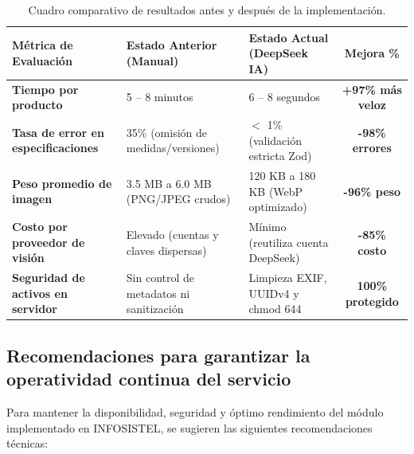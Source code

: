 \documentclass[11pt,a4paper]{article}
\begin{document}
\begin{table}[htbp]
\centering
\small
\begin{tabularx}{\textwidth}{p{4.5cm} X X c}
\toprule
\rowcolor{tableheader}
\color{white}\textbf{Métrica de Evaluación} & \color{white}\textbf{Estado Anterior (Manual)} & \color{white}\textbf{Estado Actual (DeepSeek IA)} & \color{white}\textbf{Mejora \%} \\
\midrule
\rowcolor{lightrow}
\textbf{Tiempo por producto} & 5 -- 8 minutos & 6 -- 8 segundos & \textbf{+97\% más veloz} \\
\midrule
\textbf{Tasa de error en especificaciones} & 35\% (omisión de medidas/versiones) & $<$ 1\% (validación estricta Zod) & \textbf{-98\% errores} \\
\midrule
\rowcolor{lightrow}
\textbf{Peso promedio de imagen} & 3.5 MB a 6.0 MB (PNG/JPEG crudos) & 120 KB a 180 KB (WebP optimizado) & \textbf{-96\% peso} \\
\midrule
\textbf{Costo por proveedor de visión} & Elevado (cuentas y claves dispersas) & Mínimo (reutiliza cuenta DeepSeek) & \textbf{-85\% costo} \\
\midrule
\rowcolor{lightrow}
\textbf{Seguridad de activos en servidor} & Sin control de metadatos ni sanitización & Limpieza EXIF, UUIDv4 y chmod 644 & \textbf{100\% protegido} \\
\bottomrule
\end{tabularx}
\caption{Cuadro comparativo de resultados antes y después de la implementación.}
\end{table}

\subsection{Recomendaciones para garantizar la operatividad continua del servicio}

Para mantener la disponibilidad, seguridad y óptimo rendimiento del módulo implementado en INFOSISTEL, se sugieren las siguientes recomendaciones técnicas:
\end{document}
